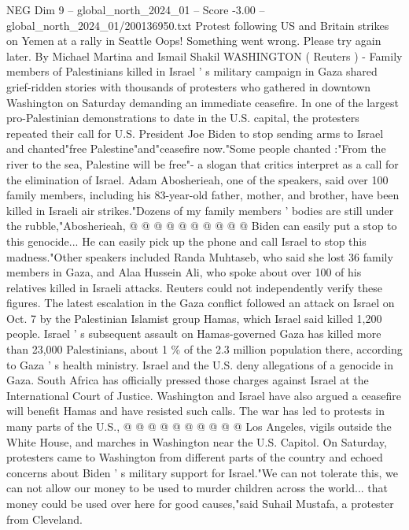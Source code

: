 \begin{textsample}{NEG Dim 9 – global\_north\_2024\_01 – Score -3.00 – global\_north\_2024\_01/200136950.txt}  \label{ex:f9_neg_186}
Protest following US and Britain strikes on Yemen at a rally in Seattle Oops!
Something went wrong.
Please try again later.
By Michael Martina and Ismail Shakil WASHINGTON ( Reuters ) - Family members of Palestinians killed in Israel ' s military campaign in Gaza shared grief-ridden stories with thousands of protesters who gathered in downtown Washington on Saturday demanding an immediate ceasefire.
In one of the largest pro-Palestinian demonstrations to date in the U.S. capital, the protesters repeated their call for U.S.
President Joe Biden to stop sending arms to Israel and chanted"free Palestine"and"ceasefire now."Some people chanted :"From the river to the sea, Palestine will be free"- a slogan that critics interpret as a call for the elimination of Israel.
Adam Abosherieah, one of the speakers, said over 100 family members, including his 83-year-old father, mother, and brother, have been killed in Israeli air strikes."Dozens of my family members ' bodies are still under the rubble,"Abosherieah, @ @ @ @ @ @ @ @ @ @ Biden can easily put a stop to this genocide...
He can easily pick up the phone and call Israel to stop this madness."Other speakers included Randa Muhtaseb, who said she lost 36 family members in Gaza, and Alaa Hussein Ali, who spoke about over 100 of his relatives killed in Israeli attacks.
Reuters could not independently verify these figures.
The latest escalation in the Gaza conflict followed an attack on Israel on Oct. 7 by the Palestinian Islamist group Hamas, which Israel said killed 1,200 people.
Israel ' s subsequent assault on Hamas-governed Gaza has killed more than 23,000 Palestinians, about 1 \% of the 2.3 million population there, according to Gaza ' s health ministry.
Israel and the U.S. deny allegations of a genocide in Gaza.
South Africa has officially pressed those charges against Israel at the International Court of Justice.
Washington and Israel have also argued a ceasefire will benefit Hamas and have resisted such calls.
The war has led to protests in many parts of the U.S., @ @ @ @ @ @ @ @ @ @ Los Angeles, vigils outside the White House, and marches in Washington near the U.S.
Capitol.
On Saturday, protesters came to Washington from different parts of the country and echoed concerns about Biden ' s military support for Israel."We can not tolerate this, we can not allow our money to be used to murder children across the world... that money could be used over here for good causes,"said Suhail Mustafa, a protester from Cleveland.

\end{textsample}
